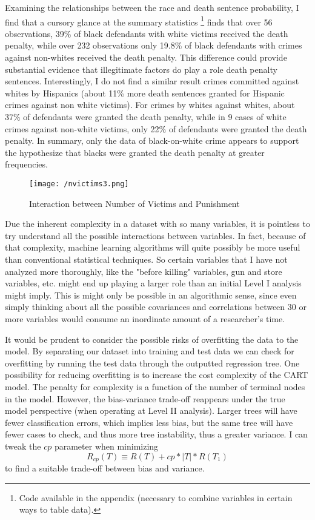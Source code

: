 \documentclass{article}
\begin{document}
Examining the relationships between the race and death sentence probability, I find that a cursory glance at the summary statistics \footnote{Code available in the appendix (necessary to combine variables in certain ways to table data).} finds that over 56 observations, 39\% of black defendants with white victims received the death penalty, while over 232 observations only 19.8\% of black defendants with crimes against non-whites received the death penalty. This difference could provide substantial evidence that illegitimate factors do play a role death penalty sentences. Interestingly, I do not find a similar result crimes committed against whites by Hispanics (about 11\% more death sentences granted for Hispanic crimes against non white victims). For crimes by whites against whites, about 37\% of defendants were granted the death penalty, while in 9 cases of white crimes against non-white victims, only 22\% of defendants were granted the death penalty. In summary, only the data of black-on-white crime appears to support the hypothesize that blacks were granted the death penalty at greater frequencies. 

\begin{figure}[!htb]
    \centering
    \texttt{[image: /nvictims3.png]}
    \caption{Interaction between Number of Victims and Punishment}
    \label{nv3}
\end{figure}


Due the inherent complexity in a dataset with so many variables, it is pointless to try understand all the possible interactions between variables. In fact, because of that complexity, machine learning algorithms will quite possibly be more useful than conventional statistical techniques. So certain variables that I have not analyzed more thoroughly, like the "before killing" variables, gun and store variables, etc. might end up playing a larger role than an initial Level I analysis might imply. This is might only be possible in an algorithmic sense, since even simply thinking about all the possible covariances and correlations between 30 or more variables would consume an inordinate amount of a researcher's time. 

It would be prudent to consider the possible risks of overfitting the data to the model. By separating our dataset into training and test data we can check for overfitting by running the test data through the outputted regression tree. One possibility for reducing overfitting is to increase the cost complexity of the CART model. The penalty for complexity is a function of the number of terminal nodes in the model. However, the bias-variance trade-off reappears under the true model perspective (when operating at Level II analysis). Larger trees will have fewer classification errors, which implies less bias, but the same tree will have fewer cases to check, and thus more tree instability, thus a greater variance. I can tweak the $cp$ parameter when minimizing $$R_{cp} (T) \equiv R(T) + cp*|T|*R(T_1)$$ to find a suitable trade-off between bias and variance. 
\end{document}

